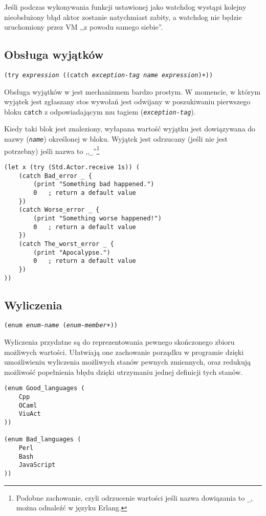 Jeśli podczas wykonywania funkcji ustawionej jako watchdog wystąpi kolejny nieobsłużony błąd aktor zostanie
natychmiast zabity, a watchdog nie będzie uruchomiony przez VM ,,z powodu samego siebie''.

\subsection{Obsługa wyjątków}

\texttt{(try \emph{expression} ((catch \emph{exception-tag} \emph{name} \emph{expression})+))}
\vspace{1em}

Obsługa wyjątków w \ViuAct jest mechanizmem bardzo prostym. W momencie, w którym wyjątek jest zgłaszany
stos wywołań jest odwijany w poszukiwaniu pierwszego bloku \texttt{catch} z odpowiadającym mu
tagiem (\texttt{\emph{exception-tag}}).

Kiedy taki blok jest znaleziony, wyłapana wartość wyjątku jest dowiązywana do nazwy (\texttt{\emph{name}})
określonej w bloku. Wyjątek jest odrzucany (jeśli nie jest potrzebny) jeśli nazwa to
,,\texttt{\_}''\footnote{Podobne zachowanie, czyli odrzucenie wartości jeśli nazwa dowiązania to
\texttt{\_}, można odnaleźć w języku Erlang.}

\begin{lstlisting}
(let x (try (Std.Actor.receive 1s)) (
    (catch Bad_error _ {
        (print "Something bad happened.")
        0   ; return a default value
    })
    (catch Worse_error _ {
        (print "Something worse happened!")
        0   ; return a default value
    })
    (catch The_worst_error _ {
        (print "Apocalypse.")
        0   ; return a default value
    })
))
\end{lstlisting}

\subsection{Wyliczenia}

\texttt{(enum \emph{enum-name} (\emph{enum-member}+))}
\newline

Wyliczenia przydatne są do reprezentowania pewnego skończonego zbioru możliwych wartości. Ułatwiają one
zachowanie porządku w programie dzięki umożliwieniu wyliczenia możliwych stanów pewnych zmiennych, oraz
redukują możliwość popełnienia błędu dzięki utrzymaniu jednej definicji tych stanów.

\begin{lstlisting}
(enum Good_languages (
    Cpp
    OCaml
    ViuAct
))

(enum Bad_languages (
    Perl
    Bash
    JavaScript
))
\end{lstlisting}

